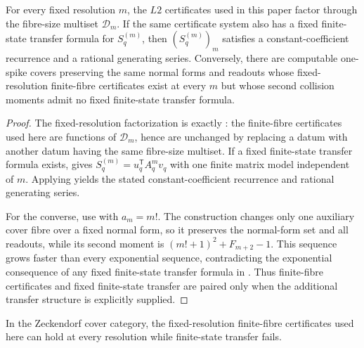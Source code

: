 \begin{proposition}
\label{thm:L2-fiber-multiset-factorization}
\label{thm:L2-finite-fiber-transfer-pairing}
For every fixed resolution \(m\), the \(L2\) certificates used in this paper
factor through the fibre-size multiset \(\mathcal D_m\).  If the same certificate
system also has a fixed finite-state transfer formula for \(S_q^{(m)}\), then
\((S_q^{(m)})_m\) satisfies a constant-coefficient recurrence and a rational
generating series.  Conversely, there are computable one-spike covers preserving
the same normal forms and readouts whose fixed-resolution finite-fibre
certificates exist at every \(m\) but whose second collision moments admit no
fixed finite-state transfer formula.
\end{proposition}

\begin{proof}
The fixed-resolution factorization is exactly
: the finite-fibre certificates used
here are functions of \(\mathcal D_m\), hence are unchanged by replacing a datum
with another datum having the same fibre-size multiset.  If a fixed finite-state transfer formula
exists,  gives
\(S_q^{(m)}=u_q^{\mathsf T}A_q^m v_q\) with one finite matrix model independent of
\(m\).  Applying  yields the stated
constant-coefficient recurrence and rational generating series.

For the converse, use  with
\(a_m=m!\).  The construction changes only one auxiliary cover fibre over a fixed
normal form, so it preserves the normal-form set and all readouts, while its
second moment is \((m!+1)^2+F_{m+2}-1\).  This sequence grows faster than every
exponential sequence, contradicting the exponential consequence of any fixed
finite-state transfer formula in .
Thus finite-fibre certificates and fixed finite-state transfer are paired only
when the additional transfer structure is explicitly supplied.
\end{proof}

\begin{corollary}
\label{cor:hankel-psd-independent}
In the Zeckendorf cover category, the fixed-resolution finite-fibre certificates
used here can hold at every resolution while finite-state transfer fails.
\end{corollary}

